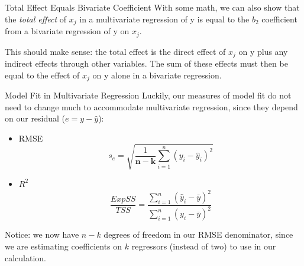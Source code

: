 \documentclass[
  ignorenonframetext,
  english,
]{beamer}
\begin{document}
\begin{frame}{Total Effect Equals Bivariate Coefficient}
\protect{}\label{total-effect-equals-bivariate-coefficient}
With some math, we can also show that the \emph{total effect} of \(x_j\)
in a multivariate regression of y is equal to the \(b_2\) coefficient
from a bivariate regression of y on \(x_j\).

This should make sense: the total effect is the direct effect of \(x_j\)
on y plus any indirect effects through other variables. The sum of these
effects must then be equal to the effect of \(x_j\) on y alone in a
bivariate regression.
\end{frame}

\begin{frame}{Model Fit in Multivariate Regression}
\protect{}\label{model-fit-in-multivariate-regression}
Luckily, our measures of model fit do not need to change much to
accommodate multivariate regression, since they depend on our residual
(\(e=y-\hat{y}\)):

\begin{itemize}
\item
  RMSE
  \[s_e=\sqrt{\frac{1}{\boldsymbol{n-k}}\sum_{i=1}^n(y_i-\hat{y}_i)^2}\]
\item
  \(R^2\)
  \[\frac{ExpSS}{TSS}=\frac{\sum_{i=1}^n(\hat{y}_i-\bar{y})^2}{\sum_{i=1}^n(y_i-\bar{y})^2}\]
\end{itemize}

Notice: we now have \(n-k\) degrees of freedom in our RMSE denominator,
since we are estimating coefficients on \(k\) regressors (instead of
two) to use in our calculation.
\end{frame}

\end{document}
